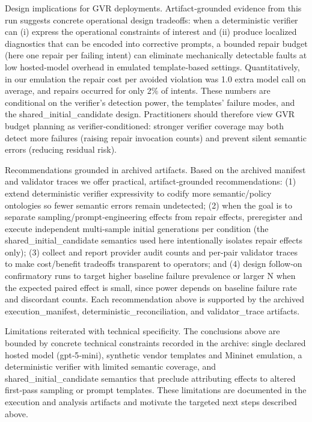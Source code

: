 \documentclass[conference]{IEEEtran}
\begin{document}
Design implications for GVR deployments. Artifact‑grounded evidence from this run suggests concrete operational design tradeoffs: when a deterministic verifier can (i) express the operational constraints of interest and (ii) produce localized diagnostics that can be encoded into corrective prompts, a bounded repair budget (here one repair per failing intent) can eliminate mechanically detectable faults at low hosted‑model overhead in emulated template‑based settings. Quantitatively, in our emulation the repair cost per avoided violation was 1.0 extra model call on average, and repairs occurred for only 2\% of intents. These numbers are conditional on the verifier's detection power, the templates' failure modes, and the shared\_initial\_candidate design. Practitioners should therefore view GVR budget planning as verifier‑conditioned: stronger verifier coverage may both detect more failures (raising repair invocation counts) and prevent silent semantic errors (reducing residual risk).

Recommendations grounded in archived artifacts. Based on the archived manifest and validator traces we offer practical, artifact‑grounded recommendations: (1) extend deterministic verifier expressivity to codify more semantic/policy ontologies so fewer semantic errors remain undetected; (2) when the goal is to separate sampling/prompt‑engineering effects from repair effects, preregister and execute independent multi‑sample initial generations per condition (the shared\_initial\_candidate semantics used here intentionally isolates repair effects only); (3) collect and report provider audit counts and per‑pair validator traces to make cost/benefit tradeoffs transparent to operators; and (4) design follow‑on confirmatory runs to target higher baseline failure prevalence or larger N when the expected paired effect is small, since power depends on baseline failure rate and discordant counts. Each recommendation above is supported by the archived execution\_manifest, deterministic\_reconciliation, and validator\_trace artifacts.

Limitations reiterated with technical specificity. The conclusions above are bounded by concrete technical constraints recorded in the archive: single declared hosted model (gpt‑5‑mini), synthetic vendor templates and Mininet emulation, a deterministic verifier with limited semantic coverage, and shared\_initial\_candidate semantics that preclude attributing effects to altered first‑pass sampling or prompt templates. These limitations are documented in the execution and analysis artifacts and motivate the targeted next steps described above.
\end{document}
